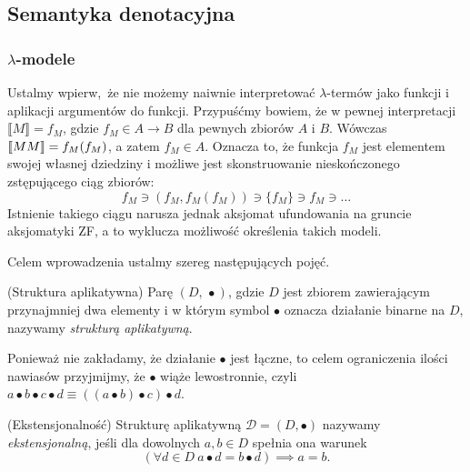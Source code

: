 \subsection{Semantyka denotacyjna}

\subsubsection{\(\lambda\)-modele}\label{subsec:lambda-models}
Ustalmy wpierw, że nie możemy naiwnie interpretować \(\lambda\)-termów jako funkcji i aplikacji argumentów do funkcji. Przypuśćmy bowiem, że w pewnej interpretacji \(\llbracket M \rrbracket=f_M\), gdzie \(f_M \in A\to B\) dla pewnych zbiorów \(A\) i \(B\). Wówczas \(\llbracket M M\rrbracket=\nobreak f_M(f_M)\), a zatem \(f_M\in A\). Oznacza to, że funkcja \(f_M\) jest elementem swojej własnej dziedziny i możliwe jest skonstruowanie nieskończonego zstępującego ciąg zbiorów:
\[
  f_M \ni \left(f_M, f_M\left(f_M\right)\right)  \ni\{f_M\} \ni f_M \ni \dots
\]
Istnienie takiego ciągu narusza jednak aksjomat ufundowania na gruncie aksjomatyki ZF, a to wyklucza możliwość określenia takich modeli.

Celem wprowadzenia ustalmy szereg następujących pojęć.

\begin{definicja}\label{def:app-structure}(Struktura aplikatywna) 
Parę \((D,\, \bullet)\), gdzie \(D\) jest zbiorem zawierającym przynajmniej dwa elementy i w którym symbol \(\bullet\) oznacza działanie binarne na \(D\), nazywamy \emph{strukturą aplikatywną}.
\end{definicja}
\begin{konwencja*}
  Ponieważ nie zakładamy, że działanie \(\bullet\) jest łączne, to celem ograniczenia ilości nawiasów przyjmijmy, że \(\bullet\) wiąże lewostronnie, czyli \(a\bullet b\bullet c\bullet d \equiv \left(\left(a\bullet b\right)\bullet c\right)\bullet d\).
\end{konwencja*}

\begin{definicja}\label{def:extens-struct}(Ekstensjonalność)
  Strukturę aplikatywną \(\mathcal{D}=(D,\bullet)\) nazywamy \emph{ekstensjonalną}, jeśli dla dowolnych \(a, b\in D\) spełnia ona warunek
  \[ (\forall d\in D\ a \bullet d = b \bullet d) \implies a = b. \]
\end{definicja}

